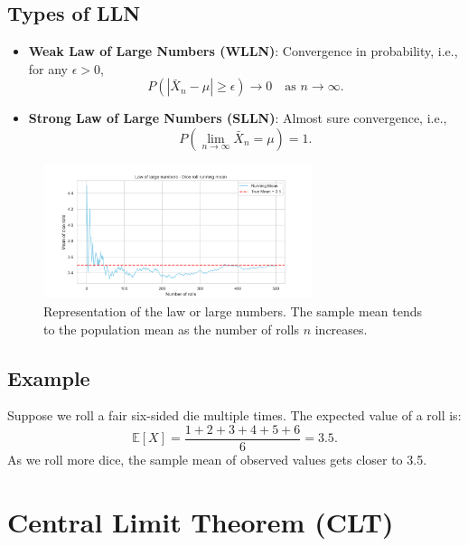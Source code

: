 \documentclass{book}
\begin{document}
\subsection{Types of LLN}
\begin{itemize}
    \item \textbf{Weak Law of Large Numbers (WLLN)}: Convergence in probability, i.e., for any $\epsilon > 0$, 
    \begin{equation}
        P(|\bar{X}_n - \mu| \geq \epsilon) \to 0 \quad \text{as } n \to \infty.
    \end{equation}
    \item \textbf{Strong Law of Large Numbers (SLLN)}: Almost sure convergence, i.e.,
    \begin{equation}
        P\left( \lim_{n \to \infty} \bar{X}_n = \mu \right) = 1.
    \end{equation}
\end{itemize}

\begin{figure}[ht]
    \centering
    \includegraphics[width=0.7\textwidth]{figures/chapter3/law_large_numbers.png}
    \caption{Representation of the law or large numbers. The sample mean tends to the population mean as the number of rolls $n$ increases.}
    \label{fig:random}
\end{figure}

\subsection{Example}
Suppose we roll a fair six-sided die multiple times. The expected value of a roll is:
\begin{equation}
    \mathbb{E}[X] = \frac{1+2+3+4+5+6}{6} = 3.5.
\end{equation}
As we roll more dice, the sample mean of observed values gets closer to 3.5.

\newpage

\section{Central Limit Theorem (CLT)}
\end{document}

